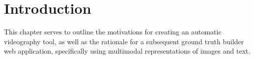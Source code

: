\documentclass{l4proj}
\begin{document}
\def\consentname {Stergious Aji} %
\def\consentdate {\today} %
\educationalconsent


\tableofcontents
%
%
%

%
%
%
%
\chapter{Introduction}

This chapter serves to outline the motivations for creating an automatic videography tool, as well as the rationale for a subsequent ground truth builder web application, specifically using multimodal representations of images and text.

\end{document}
